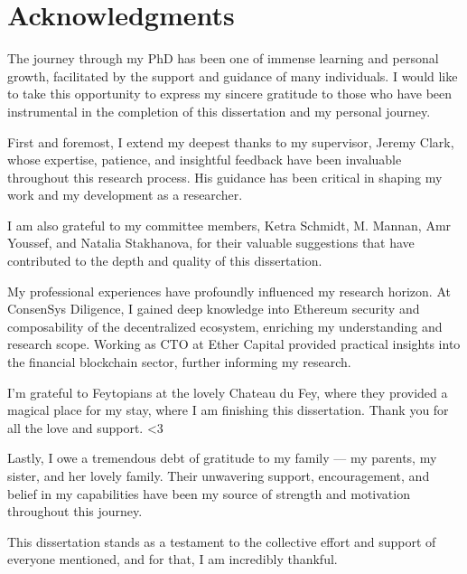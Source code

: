 
\chapter*{Acknowledgments}

The journey through my PhD has been one of immense learning and personal growth, facilitated by the support and guidance of many individuals. I would like to take this opportunity to express my sincere gratitude to those who have been instrumental in the completion of this dissertation and my personal journey.

First and foremost, I extend my deepest thanks to my supervisor, Jeremy Clark, whose expertise, patience, and insightful feedback have been invaluable throughout this research process. His guidance has been critical in shaping my work and my development as a researcher. 


I am also grateful to my committee members, Ketra Schmidt, M. Mannan, Amr Youssef, and Natalia Stakhanova, for their valuable suggestions that have contributed to the depth and quality of this dissertation.

My professional experiences have profoundly influenced my research horizon. At ConsenSys Diligence, I gained deep knowledge into Ethereum security and composability of the decentralized ecosystem, enriching my understanding and research scope. Working as CTO at Ether Capital provided practical insights into the financial blockchain sector, further informing my research. 

I'm grateful to Feytopians at the lovely Chateau du Fey, where they provided a magical place for my stay, where I am finishing this dissertation. Thank you for all the love and support. <3 


Lastly, I owe a tremendous debt of gratitude to my family — my parents, my sister, and her lovely family. Their unwavering support, encouragement, and belief in my capabilities have been my source of strength and motivation throughout this journey.

This dissertation stands as a testament to the collective effort and support of everyone mentioned, and for that, I am incredibly thankful.



